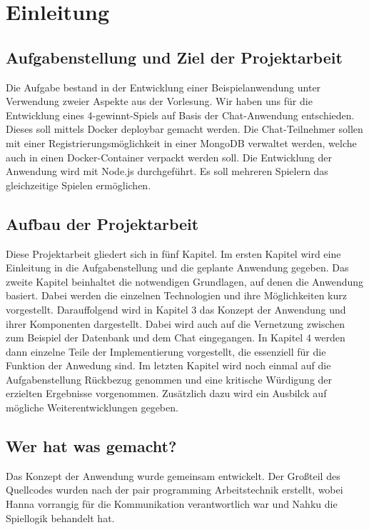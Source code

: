 
\chapter{Einleitung}\label{cha:Einleitung}

\section{Aufgabenstellung und Ziel der Projektarbeit}\label{sec:Aufgabenstellung}
Die Aufgabe bestand in der Entwicklung einer Beispielanwendung unter Verwendung zweier Aspekte aus der Vorlesung. Wir haben uns für die Entwicklung eines 4-gewinnt-Spiels auf Basis der Chat-Anwendung entschieden. Dieses soll mittels Docker deploybar gemacht werden. Die Chat-Teilnehmer sollen mit einer Registrierungsmöglichkeit in einer MongoDB verwaltet werden, welche auch in einen Docker-Container verpackt werden soll. Die Entwicklung der Anwendung wird mit Node.js durchgeführt. Es soll mehreren Spielern das gleichzeitige Spielen ermöglichen.
\section{Aufbau der Projektarbeit}\label{sec:Aufbau}
Diese Projektarbeit gliedert sich in fünf Kapitel. Im ersten Kapitel wird eine Einleitung in die Aufgabenstellung und die geplante Anwendung gegeben. Das zweite Kapitel beinhaltet die notwendigen Grundlagen, auf denen die Anwendung basiert. Dabei werden die einzelnen Technologien und ihre Möglichkeiten kurz vorgestellt. Darauffolgend wird in Kapitel 3 das Konzept der Anwendung und ihrer Komponenten dargestellt. Dabei wird auch auf die Vernetzung zwischen zum Beispiel der Datenbank und dem Chat eingegangen. In Kapitel 4 werden dann einzelne Teile der Implementierung vorgestellt, die essenziell für die Funktion der Anwedung sind. Im letzten Kapitel wird noch einmal auf die Aufgabenstellung Rückbezug genommen und eine kritische Würdigung der erzielten Ergebnisse vorgenommen. Zusätzlich dazu wird ein Ausbilck auf mögliche Weiterentwicklungen gegeben.
\section{Wer hat was gemacht?}\label{sec:Aufteilung}
Das Konzept der Anwendung wurde gemeinsam entwickelt. Der Großteil des Quellcodes wurden nach der pair programming Arbeitstechnik erstellt, wobei Hanna vorrangig für die Kommunikation verantwortlich war und Nahku die Spiellogik behandelt hat.